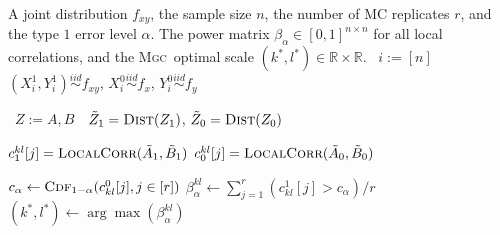 \documentclass[11pt]{article}
\providecommand{\sct}[1]{{\normalfont\textsc{#1}}}
\newcommand{\Real}{\mathbb{R}}
\newcommand{\G}{c}
\newcommand{\Linefor}[2]{%
    \State \algorithmicfor\ {#1}\ \algorithmicdo\ {#2} \algorithmicend\ \algorithmicfor%
}
\newcommand{\Mgc}{\sct{Mgc}}
\newcommand{\rto}{\leftarrow}
\begin{document}
\begin{algorithm}
\caption{Testing Powers Computation for All Local Correlations: this algorithm computes the testing powers of all local correlations. By repeatedly simulating samples by the joint distribution $f_{xy}$, sample data of size $n$ under the null and the alternative are generated for $r$ Monte-Carlo replicates. Then all sample local correlations under the null and the alternative are computed by Algorithm~\ref{alg:all_scales}, followed by estimating the testing power at each local correlation. The \Mgc~optimal scale can be found by selecting the scale that maximizes power, and it suffices to pick one optimal scale in case of ties. In the simulation we use $r=2$,$000$ MC replicates to estimate the optimal scale, and another $r=10$,$000$ MC replicates to estimate the power. The running time is $O(rn^2 \log n)$. This algorithm can be similarly adapted to training data, for which the alternative statistic can be computed from the training data while the null statistic can be computed by permutation. }
\label{alg:power}
\begin{algorithmic}[1]
\Require A joint distribution $f_{xy}$, the sample size $n$, the number of MC replicates $r$, and the type $1$ error level $\alpha$.
\Ensure The power matrix $\beta_{\alpha} \in [0,1]^{n \times n}$ for all local correlations, and the \Mgc~optimal scale $(k^{*},l^{*}) \in \Real \times \Real$.
\Linefor{$i:=[n]$}{$(X^{1}_{i},Y^{1}_{i}) \stackrel{iid}{\sim} f_{xy}$, $X^{0}_{i} \stackrel{iid}{\sim} f_{x}$, $Y^{0}_{i} \stackrel{iid}{\sim} f_{y}$} 
\Linefor{$Z:=A,B$}{$\tilde{Z}_{1}=\textsc{Dist}(Z_{1})$, $\tilde{Z}_{0}=\textsc{Dist}(Z_{0})$} 
\State $\G^{kl}_{1}[j]=\textsc{LocalCorr}(\tilde{A}_{1},\tilde{B}_{1})$ 
\State $\G^{kl}_{0}[j]=\textsc{LocalCorr}(\tilde{A}_{0},\tilde{B}_{0})$ 
\EndFor

\State $c_{\alpha} \rto \textsc{Cdf}_{1-\alpha}(\G^{0}_{kl}[j],j \in [r])$ 
\State $\beta_{\alpha}^{kl} \rto \sum_{j=1}^{r}(\G^{1}_{kl}[j]>c_{\alpha}) / r$ 
\EndFor
\State $(k^{*},l^{*}) \rto \arg\max(\beta_{\alpha}^{kl})$ 
\EndFunction
\end{algorithmic}
\end{algorithm}
\end{document}
